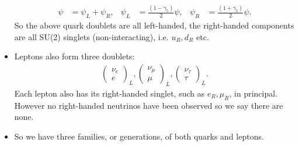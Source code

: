 \documentclass[relqm.tex]{subfiles}
\begin{document}
\begin{itemize}
\begin{align}
            \psi &= \psi_L + \psi_R, &
            \psi_L &= \frac{(1-\gamma_5)}{2}\psi, &
            \psi_R &= \frac{(1+\gamma_5)}{2}\psi.
        \end{align}
        So the above quark doublets are all left-handed, the right-handed components are all SU(2) singlets (non-interacting), i.e. $u_R,d_R$ etc.
    \item Leptons also form three doublets:
        \begin{align}
            \begin{pmatrix}\nu_e\\e\end{pmatrix}_L,
            \begin{pmatrix}\nu_\mu\\\mu\end{pmatrix}_L,
            \begin{pmatrix}\nu_\tau\\\tau\end{pmatrix}_L.
        \end{align}
        Each lepton also has its right-handed singlet, such as $e_R,\mu_R$, in principal.
        However no right-handed neutrinos have been observed so we say there are none. 
    \item So we have three families, or generations, of both quarks and leptons. 
\end{itemize}
\end{document}
